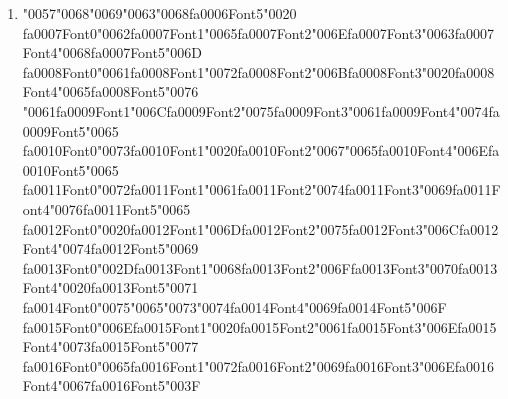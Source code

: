 \documentclass[12pt]{article}
\begin{document}
\begin{enumerate}[label=Q\arabic*.]
\begin{enumerate}[label=(\Alph*)]
    \item Pre-training on raw text with a next-word loss
    \item Post-training on instruction--response pairs to follow tasks
    \item Adding more layers to reduce perplexity values
    \item Using masks to block attention to future tokens
\end{enumerate}
\item {\char"0057}{\char"0068}{\char"0069}{\char"0063}{\char"0068}{\csname fa0006Font5\endcsname\char"0020} {\csname fa0007Font0\endcsname\char"0062}{\csname fa0007Font1\endcsname\char"0065}{\csname fa0007Font2\endcsname\char"006E}{\csname fa0007Font3\endcsname\char"0063}{\csname fa0007Font4\endcsname\char"0068}{\csname fa0007Font5\endcsname\char"006D} {\csname fa0008Font0\endcsname\char"0061}{\csname fa0008Font1\endcsname\char"0072}{\csname fa0008Font2\endcsname\char"006B}{\csname fa0008Font3\endcsname\char"0020}{\csname fa0008Font4\endcsname\char"0065}{\csname fa0008Font5\endcsname\char"0076} {\char"0061}{\csname fa0009Font1\endcsname\char"006C}{\csname fa0009Font2\endcsname\char"0075}{\csname fa0009Font3\endcsname\char"0061}{\csname fa0009Font4\endcsname\char"0074}{\csname fa0009Font5\endcsname\char"0065} {\csname fa0010Font0\endcsname\char"0073}{\csname fa0010Font1\endcsname\char"0020}{\csname fa0010Font2\endcsname\char"0067}{\char"0065}{\csname fa0010Font4\endcsname\char"006E}{\csname fa0010Font5\endcsname\char"0065} {\csname fa0011Font0\endcsname\char"0072}{\csname fa0011Font1\endcsname\char"0061}{\csname fa0011Font2\endcsname\char"0074}{\csname fa0011Font3\endcsname\char"0069}{\csname fa0011Font4\endcsname\char"0076}{\csname fa0011Font5\endcsname\char"0065} {\csname fa0012Font0\endcsname\char"0020}{\csname fa0012Font1\endcsname\char"006D}{\csname fa0012Font2\endcsname\char"0075}{\csname fa0012Font3\endcsname\char"006C}{\csname fa0012Font4\endcsname\char"0074}{\csname fa0012Font5\endcsname\char"0069} {\csname fa0013Font0\endcsname\char"002D}{\csname fa0013Font1\endcsname\char"0068}{\csname fa0013Font2\endcsname\char"006F}{\csname fa0013Font3\endcsname\char"0070}{\csname fa0013Font4\endcsname\char"0020}{\csname fa0013Font5\endcsname\char"0071} {\csname fa0014Font0\endcsname\char"0075}{\char"0065}{\char"0073}{\char"0074}{\csname fa0014Font4\endcsname\char"0069}{\csname fa0014Font5\endcsname\char"006F} {\csname fa0015Font0\endcsname\char"006E}{\csname fa0015Font1\endcsname\char"0020}{\csname fa0015Font2\endcsname\char"0061}{\csname fa0015Font3\endcsname\char"006E}{\csname fa0015Font4\endcsname\char"0073}{\csname fa0015Font5\endcsname\char"0077} {\csname fa0016Font0\endcsname\char"0065}{\csname fa0016Font1\endcsname\char"0072}{\csname fa0016Font2\endcsname\char"0069}{\csname fa0016Font3\endcsname\char"006E}{\csname fa0016Font4\endcsname\char"0067}{\csname fa0016Font5\endcsname\char"003F}

\end{enumerate}
\end{document}
